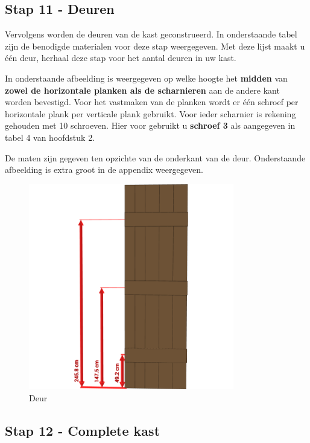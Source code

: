 \documentclass{article}
\begin{document}
\subsection{Stap 11 - Deuren}

Vervolgens worden de deuren van de kast geconstrueerd. In onderstaande tabel zijn de benodigde materialen voor deze stap weergegeven. Met deze lijst maakt u \'{e}\'{e}n deur, herhaal deze stap voor het aantal deuren in uw kast.



In onderstaande afbeelding is weergegeven op welke hoogte het \textbf{midden} van \textbf{zowel de horizontale planken als de scharnieren} aan de andere kant worden bevestigd. Voor het vastmaken van de planken wordt er \'{e}\'{e}n schroef per horizontale plank per verticale plank gebruikt. Voor ieder scharnier is rekening gehouden met 10 schroeven.  Hier voor gebruikt u \textbf{schroef 3} als aangegeven in tabel 4 van hoofdstuk 2.

De maten zijn gegeven ten opzichte van de onderkant van de deur. Onderstaande afbeelding is extra groot in de appendix weergegeven.

\begin{figure}[h!]
    \centering
    \includegraphics[width=0.8\textwidth]{scene 11 - deur.png}
    \caption{Deur}
    \label{fig:stap 11}
\end{figure}

\clearpage
\newpage

\subsection{Stap 12 - Complete kast}
\end{document}
